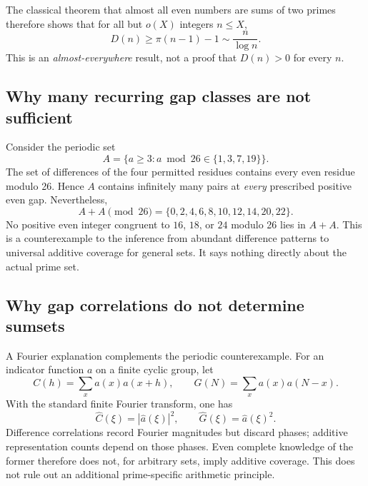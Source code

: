 \documentclass[11pt,a4paper]{article}
\theoremstyle{definition}
\begin{document}
The classical theorem that almost all even numbers are sums of two primes \cite{Estermann1938} therefore shows that for all but $o(X)$ integers $n\le X$,
\[
 D(n)\ge\pi(n-1)-1\sim \frac{n}{\log n}.
\]
This is an \emph{almost-everywhere} result, not a proof that $D(n)>0$ for every $n$.

\subsection{Why many recurring gap classes are not sufficient}
Consider the periodic set
\[
 A=\{a\ge3:a\bmod26\in\{1,3,7,19\}\}.
\]
The set of differences of the four permitted residues contains every even residue modulo 26. Hence $A$ contains infinitely many pairs at \emph{every} prescribed positive even gap. Nevertheless,
\[
 A+A\pmod{26}=\{0,2,4,6,8,10,12,14,20,22\}.
\]
No positive even integer congruent to $16$, $18$, or $24$ modulo 26 lies in $A+A$. This is a counterexample to the inference from abundant difference patterns to universal additive coverage for general sets. It says nothing directly about the actual prime set.

\subsection{Why gap correlations do not determine sumsets}
A Fourier explanation complements the periodic counterexample. For an indicator function $a$ on a finite cyclic group, let
\[
 C(h)=\sum_x a(x)a(x+h),\qquad G(N)=\sum_x a(x)a(N-x).
\]
With the standard finite Fourier transform, one has
\[
 \widehat C(\xi)=|\widehat a(\xi)|^2,
 \qquad \widehat G(\xi)=\widehat a(\xi)^2.
\]
Difference correlations record Fourier magnitudes but discard phases; additive representation counts depend on those phases. Even complete knowledge of the former therefore does not, for arbitrary sets, imply additive coverage. This does not rule out an additional prime-specific arithmetic principle.
\end{document}
